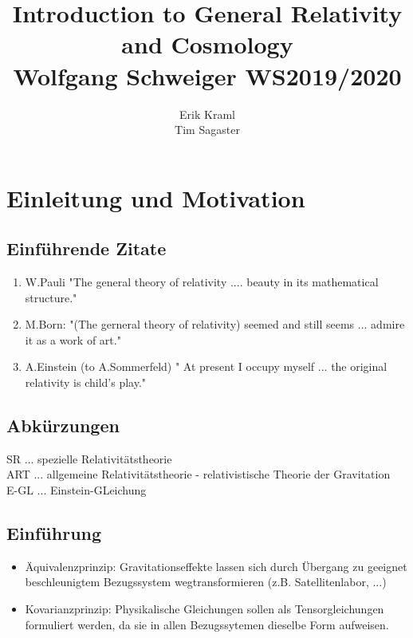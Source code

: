 \documentclass[a4paper, 11pt]{article}
\begin{document}
\title{Introduction to General Relativity and Cosmology\\\small{Wolfgang Schweiger WS2019/2020}}
\author{Erik Kraml \\ Tim Sagaster}
\maketitle
\setcounter{section}{-1}
\section{Einleitung und Motivation}
\subsection*{Einführende Zitate}
\begin{enumerate}
\item W.Pauli "The general theory of relativity ....  beauty in its mathematical structure."
\item M.Born: "(The gerneral theory of relativity) seemed and still seems ... admire it as a work of art."
\item A.Einstein (to A.Sommerfeld) " At present I occupy myself ... the original relativity is child's play."

\end{enumerate}

\subsection*{Abkürzungen}
SR ... spezielle Relativitätstheorie \\
ART ... allgemeine Relativitätstheorie - relativistische Theorie der Gravitation\\
E-GL ... Einstein-GLeichung

\subsection*{Einführung}
\begin{itemize}
\item Äquivalenzprinzip: Gravitationseffekte lassen sich durch Übergang zu geeignet beschleunigtem Bezugssystem wegtransformieren (z.B. Satellitenlabor, ...)

\item Kovarianzprinzip: Physikalische Gleichungen sollen als Tensorgleichungen formuliert werden, da sie in allen Bezugssytemen dieselbe Form aufweisen.
\end{itemize}
\end{document}

